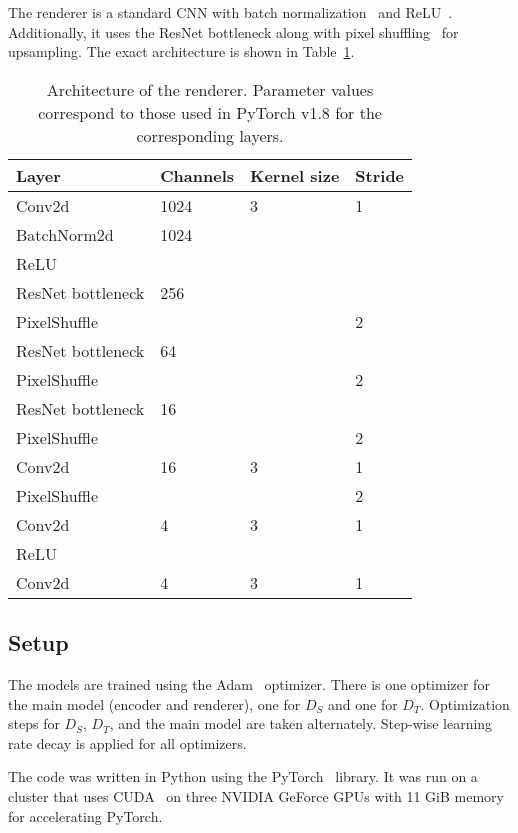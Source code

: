     The renderer is a standard CNN with batch normalization~\citep{batch-norm} and ReLU~\citep{relu}.
    Additionally, it uses the ResNet bottleneck along with pixel shuffling~\citep{pixelshuffle} for upsampling.
    The exact architecture is shown in Table~\ref{tab:renderer-arch}.

    \begin{table}
        \caption{
            Architecture of the renderer.
            Parameter values correspond to those used in PyTorch v1.8 for the corresponding layers.
        }%
        \label{tab:renderer-arch}
        \centering
        \begin{tabular}{llll}
            \toprule
            Layer & Channels & Kernel size & Stride\\
            \midrule
            Conv2d & 1024 & 3 & 1\\
            BatchNorm2d & 1024\\
            ReLU\\
            ResNet bottleneck & 256\\
            PixelShuffle &&& 2\\
            ResNet bottleneck & 64\\
            PixelShuffle &&& 2\\
            ResNet bottleneck & 16\\
            PixelShuffle &&& 2\\
            Conv2d & 16 & 3 & 1\\
            PixelShuffle &&& 2\\
            Conv2d & 4 & 3 & 1\\
            ReLU\\
            Conv2d & 4 & 3 & 1\\
            \bottomrule
        \end{tabular}
    \end{table}

\subsection{Setup}
    The models are trained using the Adam~\citep{adam} optimizer.
    There is one optimizer for the main model (encoder and renderer), one for $D_S$ and one for $D_T$.
    Optimization steps for $D_S$, $D_T$, and the main model are taken alternately.
    Step-wise learning rate decay is applied for all optimizers.

    The code was written in Python using the PyTorch~\citep{pytorch} library.
    It was run on a cluster that uses CUDA~\citep{cuda} on three NVIDIA GeForce\textsuperscript{\textregistered} GPUs with 11 GiB memory for accelerating PyTorch.

